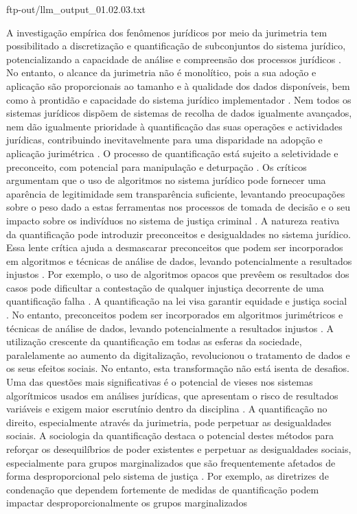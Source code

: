 \begin{agradecimentos}
    ftp-out/llm_output_01.02.03.txt 
    
    A investigação empírica dos fenômenos jurídicos por meio da jurimetria tem possibilitado a discretização e quantificação de subconjuntos do sistema jurídico, potencializando a capacidade de análise e compreensão dos processos jurídicos \cite{losano2006} . No entanto, o alcance da jurimetria não é monolítico, pois a sua adoção e aplicação são proporcionais ao tamanho e à qualidade dos dados disponíveis, bem como à prontidão e capacidade do sistema jurídico implementador \cite{losano2006}. Nem todos os sistemas jurídicos dispõem de sistemas de recolha de dados igualmente avançados, nem dão igualmente prioridade à quantificação das suas operações e actividades jurídicas, contribuindo inevitavelmente para uma disparidade na adopção e aplicação jurimétrica \cite{losano2006}. O processo de quantificação está sujeito a seletividade e preconceito, com potencial para manipulação e deturpação \cite{losano2006}. Os críticos argumentam que o uso de algoritmos no sistema jurídico pode fornecer uma aparência de legitimidade sem transparência suficiente, levantando preocupações sobre o peso dado a estas ferramentas nos processos de tomada de decisão e o seu impacto sobre os indivíduos no sistema de justiça criminal \cite{losano2006} . A natureza reativa da quantificação pode introduzir preconceitos e desigualdades no sistema jurídico. Essa lente crítica ajuda a desmascarar preconceitos que podem ser incorporados em algoritmos e técnicas de análise de dados, levando potencialmente a resultados injustos \cite{10.1590/dados.2022.65.3.267,10.3390/fi9040068}. Por exemplo, o uso de algoritmos opacos que prevêem os resultados dos casos pode dificultar a contestação de qualquer injustiça decorrente de uma quantificação falha \cite{10.1590/dados.2022.65.3.267,10.1057/s41599-020-0396-5}. A quantificação na lei visa garantir equidade e justiça social \cite{101007s1102402209481w}. No entanto, preconceitos podem ser incorporados em algoritmos jurimétricos e técnicas de análise de dados, levando potencialmente a resultados injustos \cite{10.1057/s41599-020-00557-0,10.5040/9781350220645}. A utilização crescente da quantificação em todas as esferas da sociedade, paralelamente ao aumento da digitalização, revolucionou o tratamento de dados e os seus efeitos sociais. No entanto, esta transformação não está isenta de desafios. Uma das questões mais significativas é o potencial de vieses nos sistemas algorítmicos usados em análises jurídicas, que apresentam o risco de resultados variáveis e exigem maior escrutínio dentro da disciplina \cite{10.1590/dados.2022.65.3.267,1023071190721}. A quantificação no direito, especialmente através da jurimetria, pode perpetuar as desigualdades sociais. A sociologia da quantificação destaca o potencial destes métodos para reforçar os desequilíbrios de poder existentes e perpetuar as desigualdades sociais, especialmente para grupos marginalizados que são frequentemente afetados de forma desproporcional pelo sistema de justiça \cite{10.1590/dados.2022.65.3.267,10.32586/rcda.v18i1. 585}. Por exemplo, as diretrizes de condenação que dependem fortemente de medidas de quantificação podem impactar desproporcionalmente os grupos marginalizados 
\end{agradecimentos}
